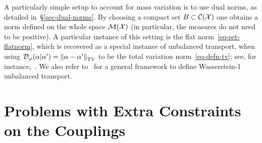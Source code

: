 \begin{rem}\label{rem-unb-dualnorms}
A particularly simple setup to account for mass variation is to use dual norms, as detailed in~\S\ref{sec-dual-norms}. By choosing a compact set $B \subset \mathcal{C}(\mathcal{X})$ one obtains a norm defined on the whole space $\mathcal{M}(\mathcal{X})$ (in particular, the measures do not need to be positive). A particular instance of this setting is the flat norm~\eqref{eq-set-flatnorm}, which is recovered as a special instance of unbalanced transport, when using $\mathcal{D}_\varphi(\alpha|\alpha')=\left\| \alpha-\alpha' \right\|_{\operatorname{TV}}$ to be the total variation norm~\eqref{eq-defn-tv}; see, for instance,~\citep{hanin1992kantorovich,lellmann2014imaging}. 
%
We also refer to~\citep{schmitzer2017framework} for a general framework to define Wasserstein-1 unbalanced transport.
\end{rem}

\section{Problems with Extra Constraints on the Couplings}

